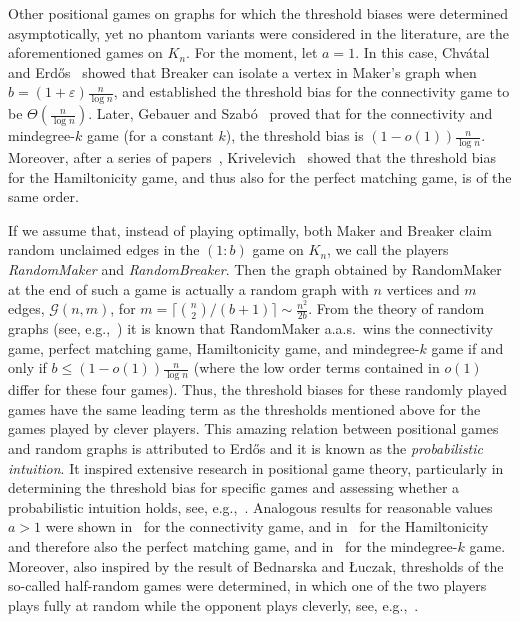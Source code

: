 \documentclass[11pt, a4paper]{article}
\numberwithin{equation}{section}
\numberwithin{figure}{section}
\newcommand{\eps}{\varepsilon}
\newcommand{\cG}{\mathcal{G}}
\begin{document}
Other positional games on graphs for which the threshold biases were determined asymptotically, yet no phantom variants were considered in the literature, are the aforementioned games on $K_n$. For the moment, let $a=1$. In this case, Chv\'{a}tal and Erd\H{o}s~\cite{chvatal1978biased} showed that Breaker can isolate a vertex in Maker's graph when $b=(1+\eps)\frac{n}{\log n}$, and established the threshold bias for the connectivity game to be $\Theta(\frac{n}{\log n})$. Later, Gebauer and Szab\'{o}~\cite{gebauer2009asymptotic} proved that for the connectivity and mindegree-$k$ game (for a constant $k$), the threshold bias is $(1-o(1))\frac{n}{\log n}$. Moreover, after a series of papers~\cite{beck1985random,bollobas1982biased,krivelevich2008biased},  Krivelevich~\cite{krivelevich2011critical} showed that the threshold bias for the Hamiltonicity game, and thus also for the perfect matching game, is of the same order. 

If we assume that, instead of playing optimally, both Maker and Breaker claim random unclaimed edges in the $(1:b)$ game on $K_n$, we call the players \emph{RandomMaker} and \emph{RandomBreaker}. Then the graph obtained by RandomMaker at the end of such a game is actually a random graph with $n$ vertices and $m$ edges, $\cG(n,m)$, for $m=\lceil\binom{n}{2}/{(b+1)}\rceil\sim\frac{n^2}{2b}$. From the theory of random graphs (see, e.g.,~\cite{bollobas1998random, janson2011random}) it is known that RandomMaker a.a.s.~wins the connectivity game, perfect matching game, Hamiltonicity game, and mindegree-$k$ game if and only if $b\leq (1-o(1))\frac{n}{\log n}$
(where the low order terms contained in $o(1)$ differ for these four games).
Thus, the threshold biases for these randomly played games have the same leading term as the thresholds mentioned above for the games played by clever players. This amazing relation between positional games and random graphs is attributed to Erd\H{o}s and it is known as the \emph{probabilistic intuition}. It inspired extensive research in positional game theory, particularly in determining the threshold bias for specific games and assessing whether a probabilistic intuition holds, see, e.g.,~\cite{beck1994deterministic,clemens2016random, gebauer2009asymptotic, stojakovic2005positional}.
Analogous results for reasonable values $a>1$ were shown in~\cite{fouadi2024asymptotically,hefetz2012doubly} for the connectivity game, and in~\cite{fouadi2024asymptotically,mikalavcki2013positional} for the Hamiltonicity and therefore also the perfect matching game, and in~\cite{fouadi2024asymptotically} for the mindegree-$k$ game. Moreover, also inspired by the result of Bednarska and {\L}uczak, thresholds of the so-called half-random games were determined, in which one of the two players plays fully at random while the opponent plays cleverly, see, e.g.,~\cite{groschwitz2016sharp,groschwitz2017sharp,krivelevich2015random}. 
\end{document}
